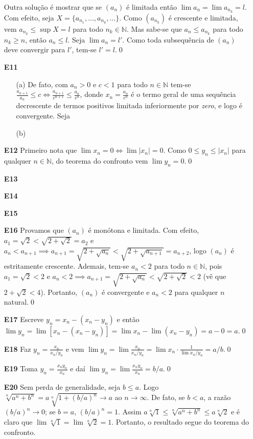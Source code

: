 \documentclass{article}
\begin{document}
\begin{enumerate}
        Outra solução é mostrar que se \((a_n)\) é limitada então \(\lim a_n = \lim a_{n_k} = l\). Com efeito, seja \(X = \{a_{n_1}, \ldots, a_{n_k}, \ldots\}\). Como \((a_{n_k})\) é crescente e limitada, vem \(a_{n_k} \leq \sup X = l\) para todo \(n_k \in \mathbb{N}\). Mas sabe-se que \(a_n \leq a_{n_k}\) para todo \(n_k \geq n\), então \(a_n \leq l\).
        Seja \(\lim a_n = l'\). Como toda subsequência de \((a_n)\) deve convergir para \(l'\), tem-se \(l'=l\).\qed
    \item [\textbf{E11}]
        \begin{enumerate}
            \item [(a)] De fato, com \(a_n > 0\) e \(c < 1\) para todo \(n \in \mathbb{N}\) tem-se \(\frac{a_{n+1}}{a_n} \leq c \iff \frac{a_{n+1}}{c^{n+1}} \leq \frac{a_n}{c^n}\), donde \(x_n = \frac{a_n}{c^n}\) é o termo geral de uma sequência decrescente de termos positivos limitada inferiormente por \emph{zero}, e logo é convergente. Seja 
            \item [(b)]
        \end{enumerate}
    \item [\textbf{E12}] Primeiro nota que \(\lim x_n = 0 \iff \lim |x_n| = 0\). Como \(0 \leq y_n \leq |x_n|\) para qualquer \(n \in \mathbb{N}\), do teorema do confronto vem \(\lim y_n = 0\).\qed
    \item [\textbf{E13}]
    \item [\textbf{E14}]
    \item [\textbf{E15}]
    \item [\textbf{E16}] Provamos que \((a_n)\) é monótona e limitada. Com efeito, \(a_1 = \sqrt{2} < \sqrt{2+\sqrt{2}} = a_2\) e \(a_n < a_{n+1} \implies a_{n+1} = \sqrt{2+\sqrt{a_n}} < \sqrt{2+\sqrt{a_{n+1}}} = a_{n+2}\), logo \((a_n)\) é estritamente crescente. Ademais, tem-se \(a_n < 2\) para todo \(n \in \mathbb{N}\), pois \(a_1 = \sqrt{2} < 2\) e \(a_n < 2 \implies a_{n+1} = \sqrt{2+\sqrt{a_n}} < \sqrt{2+\sqrt{2}} < 2\) (vê que \(2+\sqrt{2} < 4\)). Portanto, \((a_n)\) é convergente e \(a_n < 2\) para qualquer \(n\) natural.\qed
    \item [\textbf{E17}] Escreve \(y_n = x_n - (x_n - y_n)\) e então \(\lim y_n = \lim [x_n - (x_n - y_n)] = \lim x_n - \lim (x_n - y_n) = a - 0 = a\).\qed
    \item [\textbf{E18}] Faz \(\displaystyle y_n = \frac{x_n}{x_n/y_n}\) e vem \(\lim y_n = \lim \frac{x_n}{x_n/y_n} = \lim x_n \cdot \frac{1}{\lim x_n/y_n} = a/b\).\qed
    \item [\textbf{E19}] Toma \(\displaystyle y_n = \frac{x_n y_n}{x_n}\) e daí \(\lim y_n = \lim \frac{x_n y_n}{x_n} = b/a\).\qed
    \item [\textbf{E20}] Sem perda de generalidade, seja \(b \leq a\). Logo \(\sqrt[n]{a^n + b^n} = a\sqrt[n]{1 + (b/a)^n} \to a\) ao \(n \to \infty\). De fato, se \(b < a\), a razão \((b/a)^n \to 0\); se \(b = a\), \((b/a)^n = 1\). Assim \(a\sqrt[n]{1} \leq \sqrt[n]{a^n + b^n} \leq a\sqrt[n]{2}\) e é claro que \(\lim \sqrt[n]{1} = \lim \sqrt[n]{2} = 1\). Portanto, o resultado segue do teorema do confronto.
\end{enumerate}
\end{document}
